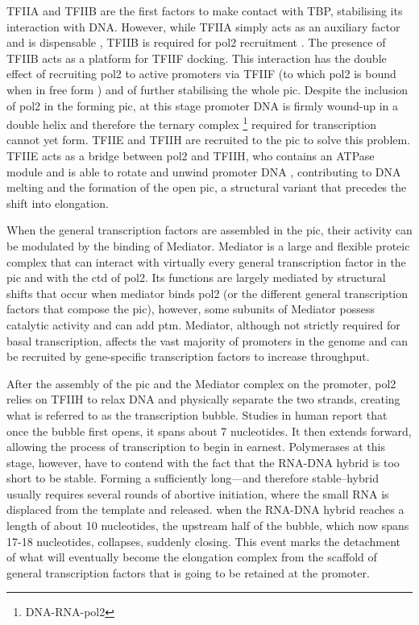 TFIIA and TFIIB are the first factors to make contact with TBP, stabilising its interaction with DNA.
However, while TFIIA simply acts as an auxiliary factor and is dispensable \citep{imbalzano:1994:transcription}, TFIIB is required for \gls{pol2} recruitment \citep{bushnell:2004:structural}.
The presence of TFIIB acts as a platform for TFIIF docking. 
This interaction has the double effect of recruiting \gls{pol2} to active promoters via TFIIF (to which \gls{pol2} is bound when in free form \citep{rani:2004:rna}) and of further stabilising the whole \gls{pic}. 
Despite the inclusion of \gls{pol2} in the forming \gls{pic}, at this stage promoter DNA is firmly wound-up in a double helix and therefore the ternary complex \footnote{DNA-RNA-\gls{pol2}} required for transcription cannot yet form.
TFIIE and TFIIH are recruited to the \gls{pic} to solve this problem.
TFIIE acts as a bridge between \gls{pol2} and TFIIH, who contains an ATPase module and is able to  rotate and unwind promoter DNA \citep{holstege:1996:opening}, contributing to DNA melting and the formation of the open \gls{pic}, a structural variant that precedes the shift into elongation.

When the general transcription factors are assembled in the \gls{pic}, their activity can be modulated by the binding of Mediator.
Mediator is a large and flexible proteic complex that can interact with virtually every general transcription factor in the \gls{pic} and with the \gls{ctd} of \gls{pol2}. 
Its functions are largely mediated by structural shifts that occur when mediator binds \gls{pol2} (or the different general transcription factors that compose the \gls{pic}), however, some subunits of Mediator possess catalytic activity and can add \gls{ptm}.
Mediator, although not strictly required for basal transcription, affects the vast majority of promoters in the genome and can be recruited by gene-specific transcription factors to increase throughput.

After the assembly of the \gls{pic} and the Mediator complex on the promoter, \gls{pol2} relies on TFIIH to relax DNA and physically separate the two strands, creating what is referred to as the transcription bubble.
Studies in human report that once the bubble first opens, it spans about 7 nucleotides.
It then extends forward, allowing the process of transcription to begin in earnest.
Polymerases at this stage, however, have to contend with the fact that the RNA-DNA hybrid is too short to be stable.
Forming a sufficiently long---and therefore stable--hybrid usually requires several rounds of abortive initiation, where the small RNA is displaced from the template and released.
when the RNA-DNA hybrid reaches a length of about 10 nucleotides, the upstream half of the bubble, which now spans 17-18 nucleotides, collapses, suddenly closing.
This event marks the detachment of what will eventually become the elongation complex from the scaffold of general transcription factors that is going to be retained at the promoter.

\clearpage